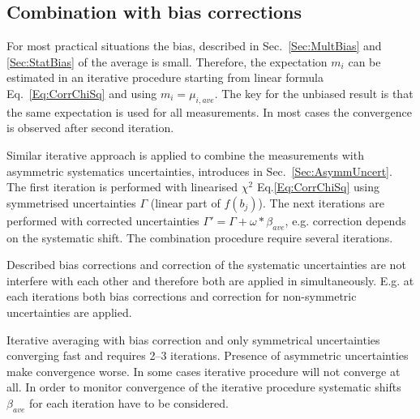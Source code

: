 \subsection{Combination with bias corrections}
\label{Sec:MinimizeBias}

For most practical situations the bias, described in Sec.~\ref{Sec:MultBias} and \ref{Sec:StatBias} of the average is small. Therefore, the expectation $m_i$ can be estimated in an iterative procedure starting from linear formula Eq.~\ref{Eq:CorrChiSq} and using $m_i = \mu_{i,ave}$. The key for the unbiased result is that the same expectation is used for all measurements. In most cases the convergence is observed after second iteration.

Similar iterative approach is applied to combine the measurements with asymmetric systematics uncertainties, introduces in Sec.~\ref{Sec:AsymmUncert}. The first iteration is performed with linearised $\chi^2$ Eq.\ref{Eq:CorrChiSq} using symmetrised uncertainties $\Gamma$ (linear part of $f(b_j)$). The next iterations are performed with corrected uncertainties $\Gamma' = \Gamma + \omega*\beta_{ave}$, e.g. correction depends on the systematic shift. The combination procedure require several iterations.

Described bias corrections and correction of the systematic uncertainties are not interfere with each other and therefore both are applied in simultaneously. E.g. at each iterations both bias corrections and correction for non-symmetric uncertainties are applied. 

Iterative averaging with bias correction and only symmetrical uncertainties converging fast and requires 2--3 iterations. Presence of asymmetric uncertainties make convergence worse. In some cases iterative procedure will not converge at all. In order to monitor convergence of the iterative procedure systematic shifts $\beta_{ave}$ for each iteration have to be considered.
